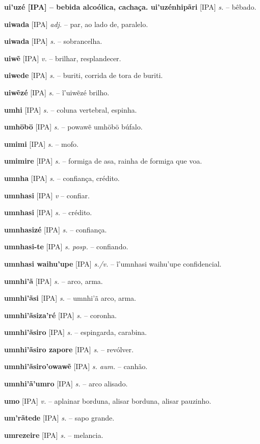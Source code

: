\textbf{ui'uzé [IPA]  -- bebida alcoólica, cachaça. ui'uzénhipãri} [IPA] \textit{s.} -- bêbado.

\textbf{uiwada} [IPA] \textit{adj.} -- par, ao lado de, paralelo.

\textbf{uiwada} [IPA] \textit{s.} -- sobrancelha.

\textbf{uiwẽ} [IPA] \textit{v.} -- brilhar, resplandecer.

\textbf{uiwede} [IPA] \textit{s.} -- buriti, corrida de tora de buriti.

\textbf{uiwẽzé} [IPA] \textit{s.} -- ĩ'uiwẽzé brilho.

\textbf{umhi} [IPA] \textit{s.} -- coluna vertebral, espinha.

\textbf{umhöbö} [IPA] \textit{s.} -- powawẽ umhöbö búfalo.

\textbf{umimi} [IPA] \textit{s.} -- mofo.

\textbf{umimire} [IPA] \textit{s.} -- formiga de asa, rainha de formiga que voa.

\textbf{umnha} [IPA] \textit{s.} -- confiança, crédito.

\textbf{umnhasi} [IPA] \textit{v} -- confiar.

\textbf{umnhasi} [IPA] \textit{s.} -- crédito.

\textbf{umnhasizé} [IPA] \textit{s.} -- confiança.

\textbf{umnhasi-te} [IPA] \textit{s. posp.} -- confiando.

\textbf{umnhasi waihu'upe} [IPA] \textit{s./v.} -- ĩ'umnhasi waihu'upe confidencial.

\textbf{umnhi'ã} [IPA] \textit{s.} -- arco, arma.

\textbf{umnhi'ãsi} [IPA] \textit{s.} -- umnhi'ã arco, arma.

\textbf{umnhi'ãsiza'ré} [IPA] \textit{s.} -- coronha.

\textbf{umnhi'ãsiro} [IPA] \textit{s.} -- espingarda, carabina.

\textbf{umnhi'ãsiro zapore} [IPA] \textit{s.} -- revólver.

\textbf{umnhi'ãsiro'owawẽ} [IPA] \textit{s. aum.} -- canhão.

\textbf{umnhi'ã'umro} [IPA] \textit{s.} -- arco alisado.

\textbf{umo} [IPA] \textit{v.} -- aplainar borduna, alisar borduna, alisar pauzinho.

\textbf{um'rãtede} [IPA] \textit{s.} -- sapo grande.

\textbf{umrezeire} [IPA] \textit{s.} -- melancia.

